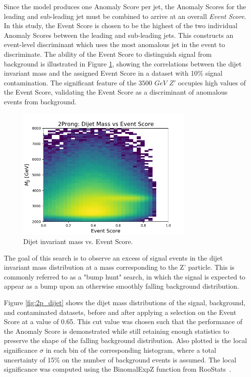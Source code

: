 \documentclass[12pt, a4paper]{article}
\begin{document}
Since the model produces one Anomaly Score per jet, the Anomaly Scores for the leading and sub-leading jet must be combined to arrive at an overall \textit{Event Score}. In this study, the Event Score is chosen to be the highest of the two individual Anomaly Scores between the leading and sub-leading jets. This constructs an event-level discriminant which uses the most anomalous jet in the event to discriminate. The ability of the Event Score to distinguish signal from background is illustrated in Figure \ref{fig:mjj_vs_evscore}, showing the correlations between the dijet invariant mass and the assigned Event Score in a dataset with 10\% signal contamination. The significant feature of the $3500$ $GeV$ $Z'$ occupies high values of the Event Score, validating the Event Score as a discriminant of anomalous events from background.

\begin{figure}[H]
	\begin{center}
		\includegraphics[width=250pt]{imgs/ProcR_2Prong_Contaminated_10p0_2Prong_Contaminated_10p0_Weights_Event_ConstOnly_Avg_JJ_M_vs_Event_Score_SaveForPaper.png}
	\end{center}
	\caption{Dijet invariant mass vs. Event Score.}
	\label{fig:mjj_vs_evscore}
\end{figure}

The goal of this search is to observe an excess of signal events in the dijet invariant mass distribution at a mass corresponding to the Z' particle. 
This is commonly referred to as a "bump hunt" search, in which the signal is expected to appear as a bump upon an otherwise smoothly falling background distribution. 

Figure \ref{fig:2p_dijet} shows the dijet mass distributions of the signal, background, and contaminated datasets, before and after applying a selection on the Event Score at a value of 0.65. This cut value was chosen such that the performance of the Anomaly Score is demonstrated while still retaining enough statistics to preserve the shape of the falling background distribution. Also plotted is the local significance $\sigma$ in each bin of the corresponding histogram, where a total uncertainty of 15\% on the number of background events is assumed. The local significance was computed using the {\sc BinomalExpZ} function from {\sc RooStats}~\cite{moneta2011roostats}. 
\end{document}
